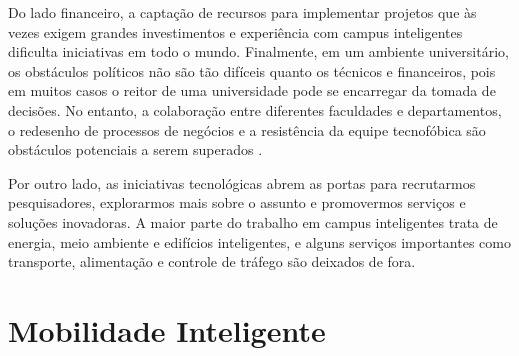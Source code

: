 Do lado financeiro, a captação de recursos para implementar projetos que às vezes exigem grandes investimentos e experiência com campus inteligentes dificulta iniciativas em todo o mundo. Finalmente, em um ambiente universitário, os obstáculos políticos não são tão difíceis quanto os técnicos e financeiros, pois em muitos casos o reitor de uma universidade pode se encarregar da tomada de decisões. No entanto, a colaboração entre diferentes faculdades e departamentos, o redesenho de processos de negócios e a resistência da equipe tecnofóbica são obstáculos potenciais a serem superados \cite{alghamdi}.

Por outro lado, as iniciativas tecnológicas abrem as portas para recrutarmos pesquisadores, explorarmos mais sobre o assunto e promovermos serviços e soluções inovadoras. A maior parte do trabalho em campus inteligentes trata de energia, meio ambiente e edifícios inteligentes, e alguns serviços importantes como transporte, alimentação e controle de tráfego são deixados de fora.

\section{Mobilidade Inteligente}

